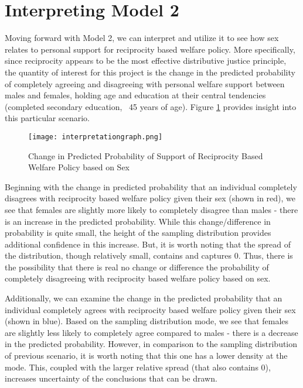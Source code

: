 \documentclass{article}
\begin{document}
\section{Interpreting Model 2}

Moving forward with Model 2, we can interpret and utilize it to see how sex relates to personal support for reciprocity based welfare policy. More specifically, since reciprocity appears to be the most effective distributive justice principle, the quantity of interest for this project is the change in the predicted probability of completely agreeing and disagreeing with personal welfare support between males and females, holding age and education at their central tendencies (completed secondary education, ~45 years of age). Figure \ref{fig:interpretation_plot} provides insight into this particular scenario. 

\begin{figure}
    \centering
    \texttt{[image: interpretationgraph.png]}
    \caption{Change in Predicted Probability of Support of Reciprocity Based Welfare Policy based on Sex}
    \label{fig:interpretation_plot}
\end{figure}

Beginning with the change in predicted probability that an individual completely disagrees with reciprocity based welfare policy given their sex (shown in red), we see that females are  slightly more likely to completely disagree than males - there is an increase in the predicted probability. While this change/difference in probability is quite small, the height of the sampling distribution provides additional confidence in this increase. But, it is worth noting that the spread of the distribution, though relatively small, contains and captures 0. Thus, there is the possibility that there is real no change or difference the probability of completely disagreeing with reciprocity based welfare policy based on sex. 

Additionally, we can examine the change in the predicted probability that an individual completely agrees with reciprocity based welfare policy given their sex (shown in blue). Based on the sampling distribution mode, we see that females are slightly less likely to completely agree compared to males - there is a decrease in the predicted probability. However, in comparison to the sampling distribution of previous scenario, it is worth noting that this one has a lower density at the mode. This, coupled with the larger relative spread (that also contains 0), increases uncertainty of the conclusions that can be drawn.
\end{document}
